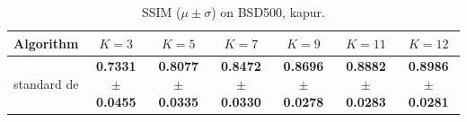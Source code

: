\begin{table}[htbp]
\centering
\caption{SSIM ($\mu \pm \sigma$) on BSD500, kapur.}
\label{tab:exp1-kapur-ssim}
\begin{tabular}{lcccccc}
\toprule
Algorithm & $K=3$ & $K=5$ & $K=7$ & $K=9$ & $K=11$ & $K=12$ \\
\midrule
standard de & \textbf{0.7331 $\pm$ 0.0455} & \textbf{0.8077 $\pm$ 0.0335} & \textbf{0.8472 $\pm$ 0.0330} & \textbf{0.8696 $\pm$ 0.0278} & \textbf{0.8882 $\pm$ 0.0283} & \textbf{0.8986 $\pm$ 0.0281} \\
\bottomrule
\end{tabular}
\end{table}